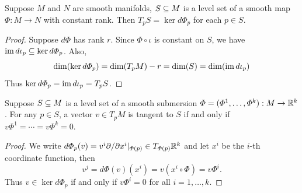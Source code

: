 \begin{corollary}
Suppose $M$ and $N$ are smooth manifolds, $S\subseteq M$ is a level set of a smooth map $\varPhi:M\to N$ with constant rank. Then $T_pS=\ker d\varPhi_p$ for each $p\in S$.
\end{corollary}
\begin{proof}
Suppose $d\varPhi$ has rank $r$. Since $\varPhi\circ\iota$ is constant on $S$, we have $\mathrm{im}\, d\iota_p\subseteq\ker d\varPhi_p$. Also, 
\[\dim(\ker d\varPhi_p)=\dim(T_pM)-r=\dim(S)=\dim(\mathrm{im}\, d\iota_p)\]
Thus $\ker d\varPhi_p=\mathrm{im}\, d\iota_p=T_pS$.
\end{proof}
\begin{corollary}\label{tangent space constant rank}
Suppose $S\subseteq M$ is a level set of a smooth submersion $\varPhi=(\varPhi^1,\dots,\varPhi^k):M\to\mathbb{R}^k$. For any $p\in S$, a vector $v\in T_pM$ is tangent to $S$ if and only if $v\varPhi^1=\cdots=v\varPhi^k=0$.
\end{corollary}
\begin{proof}
We write $d\varPhi_p(v)=v^i\partial/\partial x^i|_{\varPhi(p)}\in T_{\varPhi(p)}\mathbb{R}^k$ and let $x^i$ be the $i$-th coordinate function, then
\[v^j=d\varPhi(v)(x^i)=v(x^i\circ\varPhi)=v\varPhi^i.\]
Thus $v\in\ker d\varPhi_p$ if and only if $v\varPhi^i=0$ for all $i=1,\dots,k$.
\end{proof}
